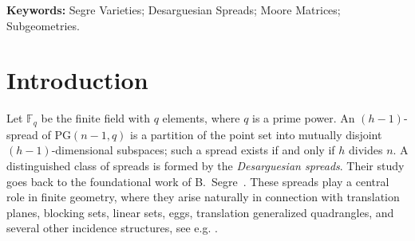 \documentclass[11pt]{article}
\def\keywords#1{\par\medskip
\noindent\textbf{Keywords:} #1}
\theoremstyle{definition}
\numberwithin{equation}{section}
\def\PG{\mathrm{PG}}
\def\F{{\mathbb F}}
\begin{document}
\keywords{Segre Varieties; Desarguesian Spreads; Moore Matrices; Subgeometries.}


\section{Introduction}


Let $\F_q$ be the finite field with $q$ elements, where $q$ is a prime power.
An $(h-1)$-spread of $\PG(n-1,q)$ is a partition of the point set into mutually
disjoint $(h-1)$-dimensional subspaces; such a spread exists if and only if
$h$ divides $n$.
A distinguished class of spreads is formed by the \emph{Desarguesian spreads}.
Their study goes back to the foundational work of B.~Segre~\cite{segre1964teoria}. These spreads play a central role in finite geometry, where they arise naturally
in connection with translation planes, blocking sets, linear sets, eggs, translation generalized quadrangles,
and several other incidence structures, see e.g.
\cite{HirschfeldThas,Lavrauw2015,bader2011desarguesian}. %
\end{document}

